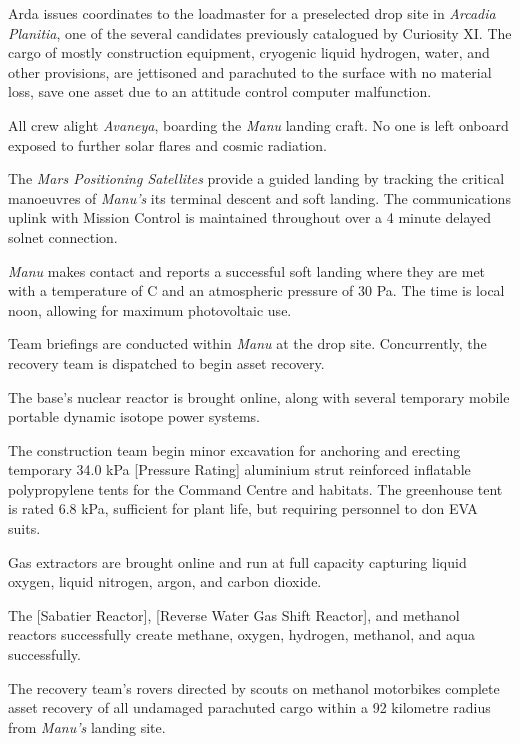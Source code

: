 Arda issues coordinates to the loadmaster for a preselected drop site in {\it Arcadia Planitia}, one of the several candidates previously catalogued by Curiosity XI. The cargo of mostly construction equipment, cryogenic liquid hydrogen, water, and other provisions, are jettisoned and parachuted to the surface with no material loss, save one asset due to an attitude control computer malfunction.
\StopTimelineDate

All crew alight {\it Avaneya}, boarding the {\it Manu} landing craft. No one is left onboard exposed to further solar flares and cosmic radiation.

The {\it Mars Positioning Satellites} provide a guided landing by tracking the critical manoeuvres of {\it Manu's} its terminal descent and soft landing. The communications uplink with Mission Control is maintained throughout over a 4 minute delayed solnet connection.

{\it Manu} makes contact and reports a successful soft landing where they are met with a temperature of C and an atmospheric pressure of 30 Pa. The time is local noon, allowing for maximum photovoltaic use.

Team briefings are conducted within {\it Manu} at the drop site. Concurrently, the recovery team is dispatched to begin asset recovery.

The base's nuclear reactor is brought online, along with several temporary mobile portable dynamic isotope power systems.

The construction team begin minor excavation for anchoring and erecting temporary 34.0 kPa [Pressure Rating] aluminium strut reinforced inflatable polypropylene tents for the Command Centre and habitats. The greenhouse tent is rated 6.8 kPa, sufficient for plant life, but requiring personnel to don EVA suits.
\StopTimelineDate

Gas extractors are brought online and run at full capacity capturing liquid oxygen, liquid nitrogen, argon, and carbon dioxide. 

The [Sabatier Reactor], [Reverse Water Gas Shift Reactor], and methanol reactors successfully create methane, oxygen, hydrogen, methanol, and aqua successfully.
\StopTimelineDate

The recovery team's rovers directed by scouts on methanol motorbikes complete asset recovery of all undamaged parachuted cargo within a 92 kilometre radius from {\it Manu's} landing site.
\StopTimelineDate


